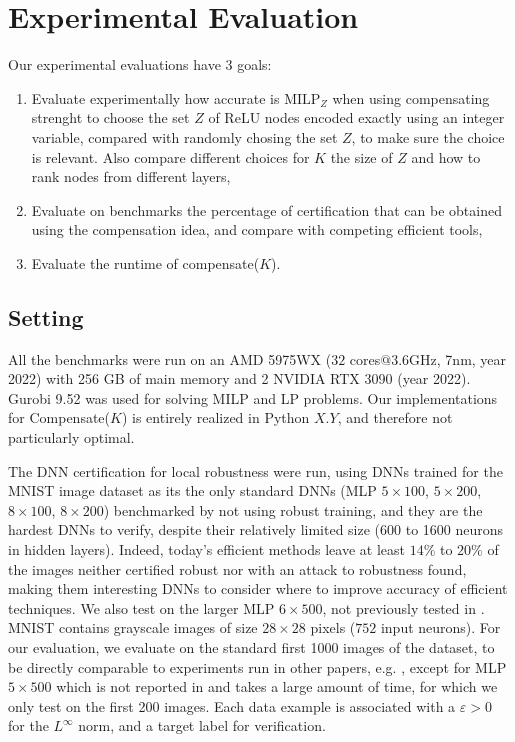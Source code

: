 \documentclass{llncs}
\newcommand{\MILP}{{\textrm{MILP}}}
\begin{document}
\section{Experimental Evaluation}

Our experimental evaluations have 3 goals:
\begin{enumerate}
  \item Evaluate experimentally how accurate is $\MILP_Z$ when using compensating strenght 
 to choose the set $Z$ of ReLU nodes encoded exactly using an integer variable, compared with randomly chosing the set $Z$, to make sure the choice is relevant. Also compare different choices for $K$ the size of $Z$ and how to rank nodes from different layers,
  \item Evaluate on benchmarks the percentage of certification that can be obtained
 using the compensation idea, and compare with competing efficient tools,
  \item Evaluate the runtime of compensate($K$).
\end{enumerate}

\subsection{Setting}
All the benchmarks were run on an AMD 5975WX ($32$ cores$@3.6$GHz, 7nm, year 2022) with 256 GB of main memory and 2 NVIDIA RTX 3090 (year 2022). Gurobi 9.52 was used for solving MILP and LP problems. Our implementations for Compensate($K$) is entirely realized in Python $X.Y$, and therefore not particularly optimal.

The DNN certification for local robustness were run, using DNNs trained for the MNIST image dataset as its the only standard DNNs (MLP $5\times 100$, $5\times 200$, $8 \times 100$, $8 \times 200$) benchmarked by \cite{crown} not using robust training, and they are the hardest DNNs to verify, despite their relatively limited size (600 to 1600 neurons in hidden layers). Indeed, today's efficient methods leave at least $14\%$ to $20\%$ of the images neither certified robust nor with an attack to robustness found, making them interesting DNNs to consider where to improve accuracy of efficient techniques. We also test on the larger MLP $6\times 500$, not previously tested in \cite{crown}. MNIST contains grayscale images of size $28 \times 28$ pixels ($752$ input neurons). For our evaluation, we evaluate on the standard first 1000 images of the dataset, to be directly comparable to experiments run in other papers, e.g. \cite{prima,crown}, except for MLP $5\times 500$ which is not reported in \cite{prima,crown} and takes a large amount of time, for which we only test on the first 200 images. Each data example is associated with a $\varepsilon>0$ for the $L^\infty$ norm, and a target label for verification. 
\end{document}
